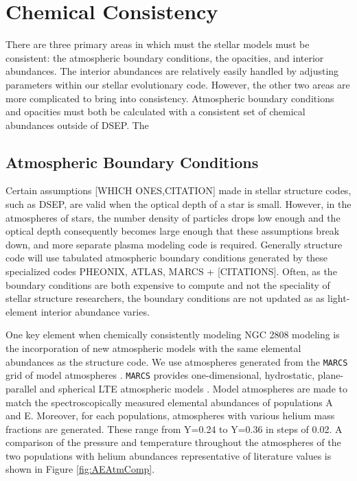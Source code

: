 \section{Chemical Consistency}\label{sec:const}
There are three primary areas in which must the stellar models must be
consistent: the atmospheric boundary conditions, the opacities, and interior
abundances. The interior abundances are relatively easily handled by adjusting
parameters within our stellar evolutionary code. However, the other two areas are
more complicated to bring into consistency. Atmospheric boundary conditions and
opacities must both be calculated with a consistent set of chemical abundances
outside of DSEP. The

\subsection{Atmospheric Boundary Conditions}\label{sec:atm}
Certain assumptions {\color{red}[WHICH ONES,CITATION]} made in stellar structure
codes, such as DSEP, are valid when the optical depth of a star is small.
However, in the atmospheres of stars, the number density of particles drops low
enough and the optical depth consequently becomes large enough that these
assumptions break down, and more separate plasma modeling code is required.
Generally structure code will use tabulated atmospheric boundary conditions
generated by these specialized codes {\color{red} PHEONIX, ATLAS, MARCS +
[CITATIONS]}. Often, as the boundary conditions are both expensive to compute
and not the speciality of stellar structure researchers, the boundary
conditions are not updated as as light-element interior abundance varies. 

One key element when chemically consistently modeling NGC 2808 modeling is the
incorporation of new atmospheric models with the same elemental abundances as
the structure code. We use atmospheres generated from the \texttt{MARCS} grid of
model atmospheres \citep{Plez2008}. \texttt{MARCS} provides one-dimensional,
hydrostatic, plane-parallel and spherical LTE atmospheric models
\citep{Gustafsson2008}. Model atmospheres are made to match the
spectroscopically measured elemental abundances of populations A and E.
Moreover, for each populations, atmospheres with  various helium mass fractions
are generated. These range from Y=0.24 to Y=0.36 in steps of 0.02. A comparison
of the pressure and temperature throughout the atmospheres of the two
populations with helium abundances representative of literature values is shown
in Figure \ref{fig:AEAtmComp}.

